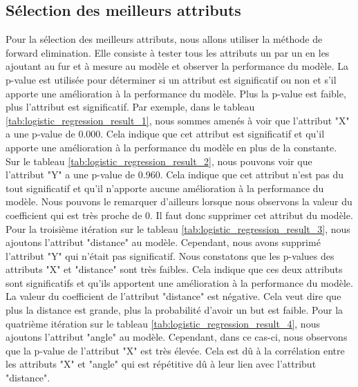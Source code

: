 \documentclass[12pt]{article}
\begin{document}
\subsection{Sélection des meilleurs attributs}
\label{sec:selection_attributs}
Pour la sélection des meilleurs attributs, nous allons utiliser la méthode de forward elimination.
Elle consiste à tester tous les attributs un par un en les ajoutant au fur et à mesure au modèle et observer la performance du modèle.
La p-value est utilisée pour déterminer si un attribut est significatif ou non et s'il apporte une amélioration à la performance du modèle.
Plus la p-value est faible, plus l'attribut est significatif.
\newline\newline
Par exemple, dans le tableau \ref{tab:logistic_regression_result_1}, nous sommes amenés à voir que l'attribut "X" a une p-value de 0.000.
Cela indique que cet attribut est significatif et qu'il apporte une amélioration à la performance du modèle en plus de la constante.
\newline\newline
Sur le tableau \ref{tab:logistic_regression_result_2}, nous pouvons voir que l'attribut "Y" a une p-value de 0.960.
Cela indique que cet attribut n'est pas du tout significatif et qu'il n'apporte aucune amélioration à la performance du modèle.
Nous pouvons le remarquer d'ailleurs lorsque nous observons la valeur du coefficient qui est très proche de 0.
Il faut donc supprimer cet attribut du modèle.
\newline\newline
Pour la troisième itération sur le tableau \ref{tab:logistic_regression_result_3}, nous ajoutons l'attribut "distance" au modèle.
Cependant, nous avons supprimé l'attribut "Y" qui n'était pas significatif.
Nous constatons que les p-values des attributs "X" et "distance" sont très faibles.
Cela indique que ces deux attributs sont significatifs et qu'ils apportent une amélioration à la performance du modèle.
La valeur du coefficient de l'attribut "distance" est négative. 
Cela veut dire que plus la distance est grande, plus la probabilité d'avoir un but est faible.
\newline\newline
Pour la quatrième itération sur le tableau \ref{tab:logistic_regression_result_4}, nous ajoutons l'attribut "angle" au modèle.
Cependant, dans ce cas-ci, nous observons que la p-value de l'attribut "X" est très élevée. 
Cela est dû à la corrélation entre les attributs "X" et "angle" qui est répétitive dû à leur lien avec l'attribut "distance".
\end{document}
